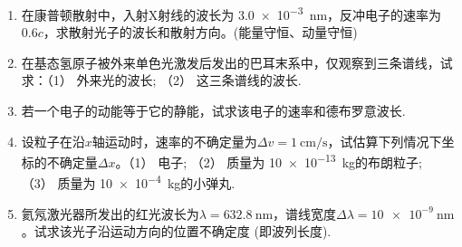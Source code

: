 \documentclass[UTF-8]{ctexart}
\newcommand{\csi}[2]{ \SI{#1}{#2}}
\begin{document}
\begin{enumerate}
    \item 在康普顿散射中，入射X射线的波长为\csi{3.0e-3}{\nm}，反冲电子的速率为\(0.6c\)，求散射光子的波长和散射方向。(能量守恒、动量守恒)
    \item 在基态氢原子被外来单色光激发后发出的巴耳末系中，仅观察到三条谱线，试求：（1） 外来光的波长; （2） 这三条谱线的波长.
    \item 若一个电子的动能等于它的静能，试求该电子的速率和德布罗意波长.
    \item 设粒子在沿\(x\)轴运动时，速率的不确定量为\(\Delta v=\csi{1}{\cm\per\second}\)，试估算下列情况下坐标的不确定量\(\Delta x\)。（1） 电子; （2） 质量为\csi{10e-13}{\kg}的布朗粒子;
         （3） 质量为\csi{10e-4}{\kg}的小弹丸.
    \item 氦氖激光器所发出的红光波长为\(\lambda=\csi{632.8}{\nm}\)，谱线宽度\(\Delta\lambda=\csi{10e-9}{\nm}\)。试求该光子沿运动方向的位置不确定度 (即波列长度).
\end{enumerate}
\end{document}
